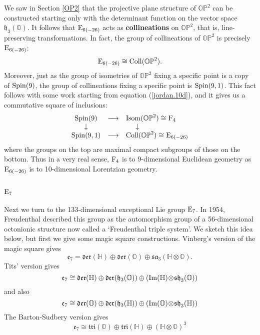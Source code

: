 \documentclass[12pt]{article}
\renewcommand\H{{\mathbb H}}
\renewcommand\O{{\mathbb O}}
\newcommand\OP{{\mathbb {OP}}}
\newcommand{\Spin}{{\rm Spin}}
\newcommand{\E}{{\rm E}}
\newcommand{\F}{{\rm F}}
\newcommand{\e}{{\mathfrak {e}}}
\newcommand{\sa}{{\mathfrak {sa}}}
\newcommand{\h}{{\mathfrak {h}}}
\newcommand{\sh}{{\mathfrak {sh}}}
\newcommand{\Isom}{{\rm Isom}}
\newcommand{\Der}{{\mathfrak {der}}}
\newcommand{\Tri}{{\mathfrak {tri}}}
\renewcommand{\Im}{{\rm Im}}
\newcommand{\tensor}{\otimes}
\newcommand{\iso}{\cong}
\newcommand{\be}{\begin{equation}}
\newcommand{\ee}{\end{equation}}
\begin{document}
We saw in Section \ref{OP2} that the projective plane structure of
$\OP^2$ can be constructed starting only with the determinant function
on the vector space $\h_3(\O)$.   It follows that $\E_{6(-26)}$
acts as {\bf collineations} on $\OP^2$, that is, line-preserving
transformations.  In fact, the group of collineations of $\OP^2$ is
precisely $\E_{6(-26)}$:
\[   \E_{6(-26)}  \iso     {\rm Coll}(\OP^2). \]
Moreover, just as the group of isometries of $\OP^2$ fixing a specific
point is a copy of $\Spin(9)$, the group of collineations fixing a
specific point is $\Spin(9,1)$.  This fact follows with some work
starting from equation (\ref{jordan.10d}), and it gives us a commutative
square of inclusions:
\[
\begin{array}{ccl} 
   \Spin(9) &\longrightarrow& \Isom(\OP^2) \iso \F_4 \\
   \downarrow & &     \;\;\;\;\;  \downarrow  \\
   \Spin(9,1)    & \longrightarrow & {\rm Coll}(\OP^2) \iso \E_{6(-26)} 
\end{array}
\]
where the groups on the top are maximal compact subgroups of those on
the bottom.  Thus in a very real sense, $\F_4$ is to 9-dimensional
Euclidean geometry as $\E_{6(-26)}$ is to 10-dimensional Lorentzian
geometry.

\subsection{$\E_7$}  \label{E7}   

Next we turn to the 133-dimensional exceptional Lie group $\E_7$.
In 1954, Freudenthal \cite{Freudenthal2} described this group as
the automorphism group of a 56-dimensional octonionic structure now
called a `Freudenthal triple system'.  We sketch this idea
below, but first we give some magic square constructions.
Vinberg's version of the magic square gives
\[
\e_7 = \Der(\H) \oplus \Der(\O) \oplus \sa_3(\H \tensor \O)  .
\label{e7.1}
\]
Tits' version gives
\be
\e_7 \iso \Der(\H) \oplus \Der(\h_3(\O)) \oplus    
(\Im(\H) \!\tensor \! \sh_3(\O))  
\label{e7.2}
\ee
and also
\[
\e_7 \iso \Der(\O) \oplus \Der(\h_3(\H)) \oplus    
(\Im(\O) \!\tensor \! \sh_3(\H))  
\label{e7.3}
\]
The Barton-Sudbery version gives
\be
\e_7 \iso \Tri(\O) \oplus \Tri(\H) \oplus (\H \tensor \O)^3 
\label{e7.4}
\ee
   
\end{document}
